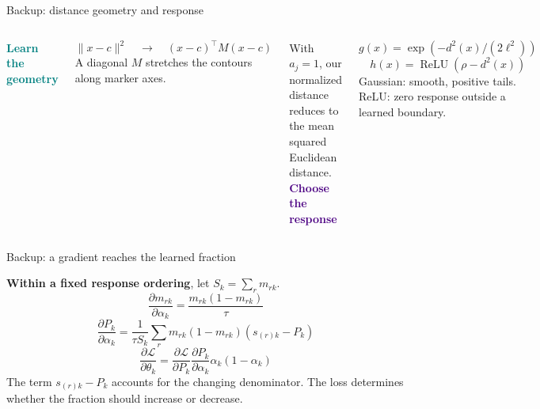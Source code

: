 \documentclass[aspectratio=169,10pt]{beamer}
\newcommand{\relu}{\operatorname{ReLU}}
\begin{document}
\begin{frame}{Backup: distance geometry and response}

\begin{columns}[T,onlytextwidth]
\textcolor{Teal}{\textbf{Learn the geometry}}\par
\[\|x-c\|^2\quad\longrightarrow\quad (x-c)^\top M(x-c)\]
A diagonal $M$ stretches the contours along marker axes.\par
\vspace{3mm}
With $a_j=1$, our normalized distance reduces to the mean squared Euclidean distance.
\textcolor{Indigo}{\textbf{Choose the response}}\par
\[g(x)=\exp\!\left(-d^2(x)/(2\ell^2)\right)\]
\[h(x)=\relu\!\left(\rho-d^2(x)\right)\]
Gaussian: smooth, positive tails.\\
ReLU: zero response outside a learned boundary.
\end{columns}

\end{frame}

\begin{frame}{Backup: a gradient reaches the learned fraction}

\textbf{Within a fixed response ordering}, let $S_k=\sum_r m_{rk}$.
\[\frac{\partial m_{rk}}{\partial\alpha_k}=\frac{m_{rk}(1-m_{rk})}{\tau}\]
\[\boxed{\frac{\partial P_k}{\partial\alpha_k}
=\frac1{\tau S_k}\sum_r m_{rk}(1-m_{rk})(s_{(r)k}-P_k)}\]
\[\frac{\partial\mathcal L}{\partial\theta_k}
=\frac{\partial\mathcal L}{\partial P_k}
\frac{\partial P_k}{\partial\alpha_k}\alpha_k(1-\alpha_k)\]
\small The term $s_{(r)k}-P_k$ accounts for the changing denominator. The loss determines whether the fraction should increase or decrease.

\end{frame}
\end{document}

